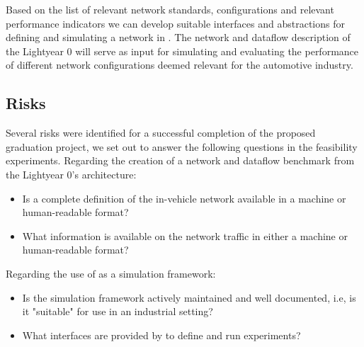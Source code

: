 Based on the list of relevant network standards, configurations and relevant performance indicators we can develop suitable interfaces and abstractions for defining and simulating a network in \omnet. The network and dataflow description of the Lightyear 0 will serve as input for simulating and evaluating the performance of different network configurations deemed relevant for the automotive industry.

\subsection{Risks}
\label{sec:researchrisks}
Several risks were identified for a successful completion of the proposed graduation project, we set out to answer the following questions in the feasibility experiments. Regarding the creation of a network and dataflow benchmark from the Lightyear 0's architecture:
\begin{itemize}
\item Is a complete definition of the in-vehicle network available in a machine or human-readable format?
\item What information is available on the network traffic in either a machine or human-readable format?
\end{itemize}

Regarding the use of \omnet as a simulation framework:
\begin{itemize}
\item Is the simulation framework \omnet actively maintained and well documented, i.e, is it "suitable" for use in an industrial setting?
\item What interfaces are provided by \omnet to define and run experiments?
\end{itemize}